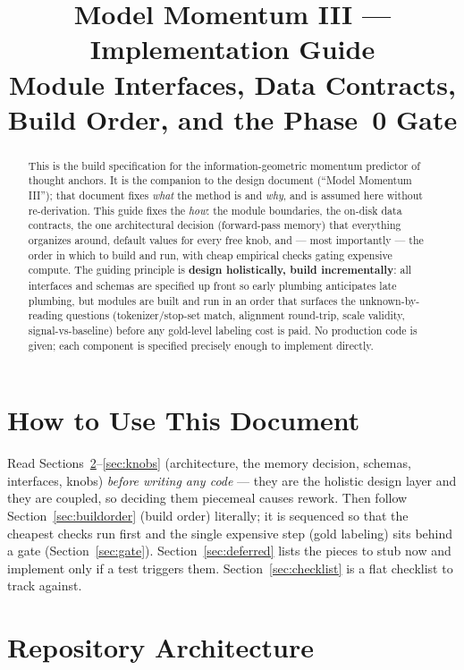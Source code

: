 \documentclass[11pt]{article}
\title{\textbf{Model Momentum III --- Implementation Guide}\\[3pt]
\large Module Interfaces, Data Contracts, Build Order, and the Phase~0 Gate}
\author{}
\date{}
\begin{document}
\maketitle

\begin{abstract}
This is the build specification for the information-geometric momentum predictor of thought anchors. It is the companion to the design document (``Model Momentum III''); that document fixes \emph{what} the method is and \emph{why}, and is assumed here without re-derivation. This guide fixes the \emph{how}: the module boundaries, the on-disk data contracts, the one architectural decision (forward-pass memory) that everything organizes around, default values for every free knob, and --- most importantly --- the order in which to build and run, with cheap empirical checks gating expensive compute. The guiding principle is \textbf{design holistically, build incrementally}: all interfaces and schemas are specified up front so early plumbing anticipates late plumbing, but modules are built and run in an order that surfaces the unknown-by-reading questions (tokenizer/stop-set match, alignment round-trip, scale validity, signal-vs-baseline) before any gold-level labeling cost is paid. No production code is given; each component is specified precisely enough to implement directly.
\end{abstract}

\tableofcontents

\section{How to Use This Document}

Read Sections~\ref{sec:arch}--\ref{sec:knobs} (architecture, the memory decision, schemas, interfaces, knobs) \emph{before writing any code} --- they are the holistic design layer and they are coupled, so deciding them piecemeal causes rework. Then follow Section~\ref{sec:buildorder} (build order) literally; it is sequenced so that the cheapest checks run first and the single expensive step (gold labeling) sits behind a gate (Section~\ref{sec:gate}). Section~\ref{sec:deferred} lists the pieces to stub now and implement only if a test triggers them. Section~\ref{sec:checklist} is a flat checklist to track against.

\section{Repository Architecture}
\label{sec:arch}
\end{document}
